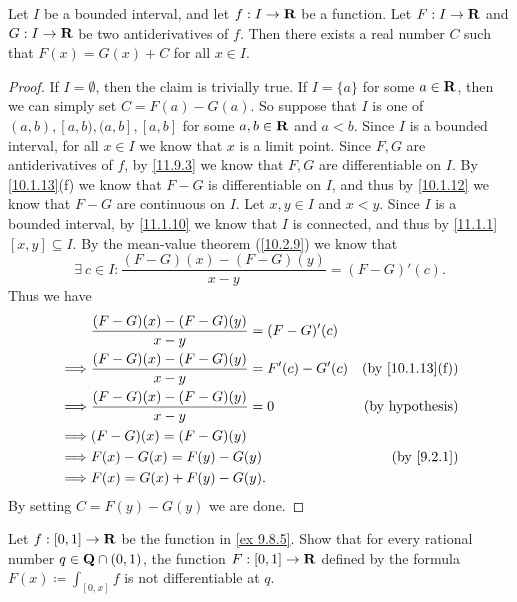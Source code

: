 \begin{lemma}\label{11.9.5}
  Let \(I\) be a bounded interval, and let \(f : I \to \mathbf{R}\) be a function.
  Let \(F : I \to \mathbf{R}\) and \(G : I \to \mathbf{R}\) be two antiderivatives of \(f\).
  Then there exists a real number \(C\) such that \(F(x) = G(x) + C\) for all \(x \in I\).
\end{lemma}

\begin{proof}
  If \(I = \emptyset\), then the claim is trivially true.
  If \(I = \{a\}\) for some \(a \in \mathbf{R}\), then we can simply set \(C = F(a) - G(a)\).
  So suppose that \(I\) is one of \((a, b), [a, b), (a, b], [a, b]\) for some \(a, b \in \mathbf{R}\) and \(a < b\).
  Since \(I\) is a bounded interval, for all \(x \in I\) we know that \(x\) is a limit point.
  Since \(F, G\) are antiderivatives of \(f\), by \cref{11.9.3} we know that \(F, G\) are differentiable on \(I\).
  By \cref{10.1.13}(f) we know that \(F - G\) is differentiable on \(I\), and thus by \cref{10.1.12} we know that \(F - G\) are continuous on \(I\).
  Let \(x, y \in I\) and \(x < y\).
  Since \(I\) is a bounded interval, by \cref{11.1.10} we know that \(I\) is connected, and thus by \cref{11.1.1} \([x, y] \subseteq I\).
  By the mean-value theorem (\cref{10.2.9}) we know that
  \[
    \exists\ c \in I : \frac{(F - G)(x) - (F - G)(y)}{x - y} = (F - G)'(c).
  \]
  Thus we have
  \begin{align*}
             & \frac{(F - G)(x) - (F - G)(y)}{x - y} = (F - G)'(c)                                   \\
    \implies & \frac{(F - G)(x) - (F - G)(y)}{x - y} = F'(c) - G'(c) & \text{(by \cref{10.1.13}(f))} \\
    \implies & \frac{(F - G)(x) - (F - G)(y)}{x - y} = 0             & \text{(by hypothesis)}        \\
    \implies & (F - G)(x) = (F - G)(y)                                                               \\
    \implies & F(x) - G(x) = F(y) - G(y)                             & \text{(by \cref{9.2.1})}      \\
    \implies & F(x) = G(x) + F(y) - G(y).
  \end{align*}
  By setting \(C = F(y) - G(y)\) we are done.
\end{proof}

\exercisesection

\begin{exercise}\label{ex 11.9.1}
  Let \(f : [0, 1] \to \mathbf{R}\) be the function in \cref{ex 9.8.5}.
  Show that for every rational number \(q \in \mathbf{Q} \cap (0, 1)\), the function \(F : [0, 1] \to \mathbf{R}\) defined by the formula \(F(x) \coloneqq \int_{[0, x]} f\) is not differentiable at \(q\).
\end{exercise}

